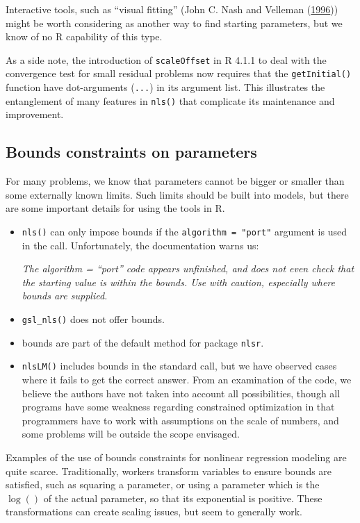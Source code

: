 \documentclass[
]{article}
\begin{document}
Interactive tools, such as ``visual fitting'' (John C. Nash and Velleman
(\protect\hyperlink{ref-nash1996nonlinear}{1996})) might be worth
considering as another way to find starting parameters, but we know of
no R capability of this type.

As a side note, the introduction of \texttt{scaleOffset} in R 4.1.1 to
deal with the convergence test for small residual problems now requires
that the \texttt{getInitial()} function have dot-arguments
(\texttt{...}) in its argument list. This illustrates the entanglement
of many features in \texttt{nls()} that complicate its maintenance and
improvement.

\hypertarget{bounds-constraints-on-parameters}{%
\subsection{Bounds constraints on
parameters}\label{bounds-constraints-on-parameters}}

For many problems, we know that parameters cannot be bigger or smaller
than some externally known limits. Such limits should be built into
models, but there are some important details for using the tools in R.

\begin{itemize}
\item
  \texttt{nls()} can only impose bounds if the
  \texttt{algorithm\ =\ "port"} argument is used in the call.
  Unfortunately, the documentation warns us:

  \emph{The algorithm = ``port'' code appears unfinished, and does not
  even check that the starting value is within the bounds. Use with
  caution, especially where bounds are supplied.}
\item
  \texttt{gsl\_nls()} does not offer bounds.
\item
  bounds are part of the default method for package \texttt{nlsr}.
\item
  \texttt{nlsLM()} includes bounds in the standard call, but we have
  observed cases where it fails to get the correct answer. From an
  examination of the code, we believe the authors have not taken into
  account all possibilities, though all programs have some weakness
  regarding constrained optimization in that programmers have to work
  with assumptions on the scale of numbers, and some problems will be
  outside the scope envisaged.
\end{itemize}

Examples of the use of bounds constraints for nonlinear regression
modeling are quite scarce. Traditionally, workers transform variables to
ensure bounds are satisfied, such as squaring a parameter, or using a
parameter which is the \(\log()\) of the actual parameter, so that its
exponential is positive. These transformations can create scaling
issues, but seem to generally work.
\end{document}
